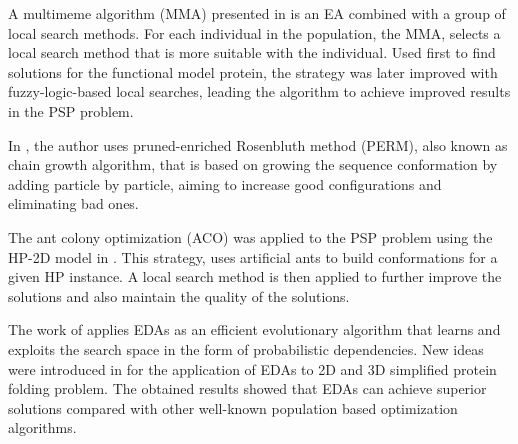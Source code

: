 \documentclass[conference]{IEEEtran}
\begin{document}
%



A multimeme algorithm (MMA) presented in \cite{krasnogor2002multimeme} is an EA combined with a
group of local search methods. For each individual in the population, the MMA, selects a local search method that is more suitable with the individual. Used first to find solutions for the functional model protein, the strategy was later improved with fuzzy-logic-based local searches, leading the algorithm to achieve improved results in the PSP problem.







In \cite{hsu2003growth}, the author uses  pruned-enriched Rosenbluth method (PERM), also known as chain growth algorithm, that is based on growing the sequence conformation by adding particle by particle, aiming to increase good configurations and eliminating bad ones.


The ant colony optimization (ACO) was applied to the PSP problem using the HP-2D model in \cite{shmygelska2002ant, shmygelska2003improved}. This strategy, uses artificial ants to build conformations for a given HP instance. A local search method is then applied to further improve the solutions and also maintain the quality of the solutions.

The work of \cite{santana2008component} applies EDAs as an efficient evolutionary algorithm that learns and exploits the search space in the form of probabilistic dependencies. New ideas were introduced in \cite{santana2008component}
for the application of EDAs to 2D and 3D simplified protein folding problem. The obtained results showed that EDAs can achieve superior solutions compared with other well-known population based optimization algorithms.



\end{document}
